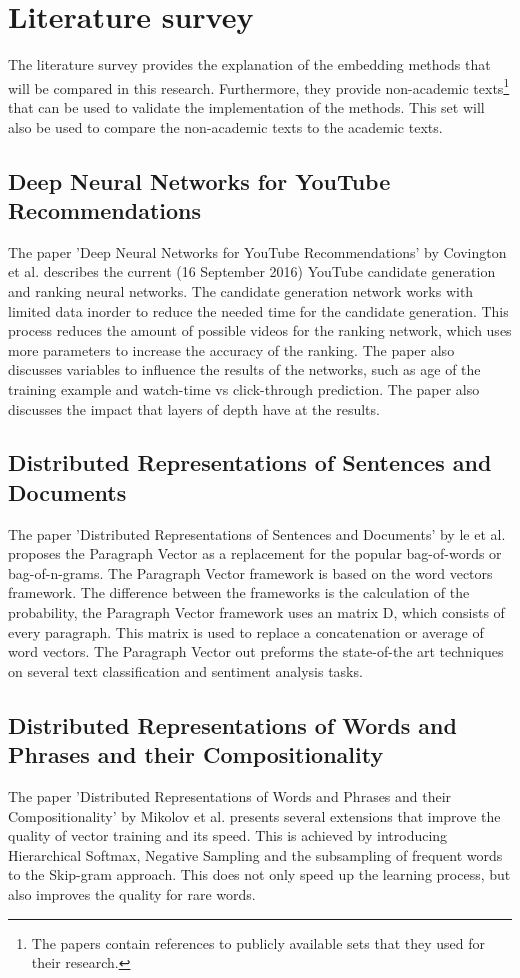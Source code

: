 \documentclass[10pt,a4paper]{article}
\begin{document}
\section{Literature survey}
The literature survey provides the explanation of the embedding methods that will be compared in this research. Furthermore, they provide  non-academic texts\footnote{The papers contain references to publicly available sets that they used for their research.} that can be used to validate the implementation of the methods. This set will also be used to compare the non-academic texts to the academic texts.

\subsection{Deep Neural Networks for YouTube \\Recommendations}
The paper 'Deep Neural Networks for YouTube Recommendations' by Covington et al.\cite{covington2016deep} describes the current (16 September 2016) YouTube candidate generation and ranking neural networks. The candidate generation network works with limited data inorder to reduce the needed time for the candidate generation. This process reduces the amount of possible videos for the ranking network, which uses more parameters to increase the accuracy of the ranking. The paper also discusses variables to influence the results of the networks, such as age of the training example and watch-time vs click-through prediction. The paper also discusses the impact that layers of depth have at the results.
\subsection{Distributed Representations of Sentences and Documents}
The paper 'Distributed Representations of Sentences and Documents' by le et al.\cite{le2014distributed} proposes the Paragraph Vector as a replacement for the popular bag-of-words or bag-of-n-grams. The Paragraph Vector framework is based on the word vectors framework. The difference between the frameworks is the calculation of the probability, the Paragraph Vector framework uses an matrix D, which consists of every paragraph. This matrix is used to replace a concatenation or average of word vectors. The Paragraph Vector out preforms the state-of-the art techniques on several text classification and sentiment analysis tasks.
\subsection{Distributed Representations of Words and Phrases and their Compositionality}
The paper 'Distributed Representations of Words and Phrases and their Compositionality' by Mikolov et al.\cite{mikolov2013distributed} presents several extensions that improve the quality of vector training and its speed. This is achieved by introducing Hierarchical Softmax, Negative Sampling and the subsampling of frequent words to the Skip-gram approach. This does not only speed up the learning process, but also improves the quality for rare words.
\end{document}
